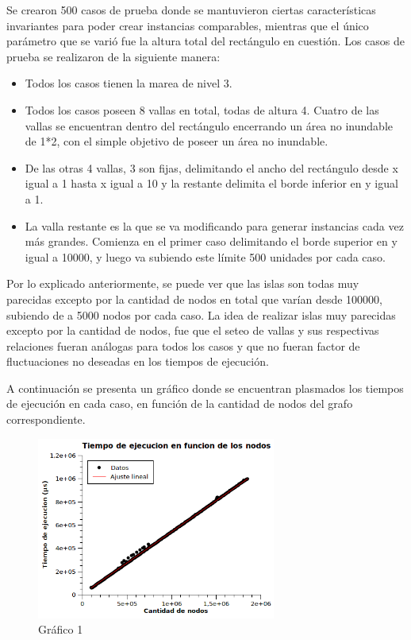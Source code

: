 \documentclass[a4paper, 12pt]{article}
\begin{document}
Se crearon 500 casos de prueba donde se mantuvieron ciertas características invariantes para poder crear instancias comparables, mientras que el único parámetro que se varió fue la altura total del rectángulo en cuestión.
Los casos de prueba se realizaron de la siguiente manera:
\begin{itemize}
\item Todos los casos tienen la marea de nivel 3.
\item Todos los casos poseen 8 vallas en total, todas de altura 4. Cuatro de las vallas se encuentran dentro del rectángulo encerrando un área no inundable de 1*2, con el simple objetivo de poseer un área no inundable.
\item De las otras 4 vallas, 3 son fijas, delimitando el ancho del rectángulo desde x igual a 1 hasta x igual a 10 y la restante delimita el borde inferior en y igual a 1.
\item La valla restante es la que se va modificando para generar instancias cada vez más grandes. Comienza en el primer caso delimitando el borde superior en y igual a 10000, y luego va subiendo este límite 500 unidades por cada caso.
\end{itemize}

Por lo explicado anteriormente, se puede ver que las islas son todas muy parecidas excepto por la cantidad de nodos en total que varían desde 100000, subiendo de a 5000 nodos por cada caso. La idea de realizar islas muy parecidas excepto por la cantidad de nodos, fue que el seteo de vallas y sus respectivas relaciones fueran análogas para todos los casos y que no fueran factor de fluctuaciones no deseadas en los tiempos de ejecución.

A continuación se presenta un gráfico donde se encuentran plasmados los tiempos de ejecución en cada caso, en función de la cantidad de nodos del grafo correspondiente.

\begin{figure}[H]
\centering
\includegraphics[width=0.7\textwidth]{imagenes/Resultados2.png} 
\caption{Gráfico 1}
\end{figure}
\end{document}
